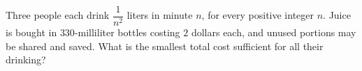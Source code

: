 Three people each drink $\dfrac{1}{n^2}$ liters in minute $n$, for every positive integer $n$. Juice is bought in $330$-milliliter bottles costing $2$ dollars each, and unused portions may be shared and saved. What is the smallest total cost sufficient for all their drinking?
